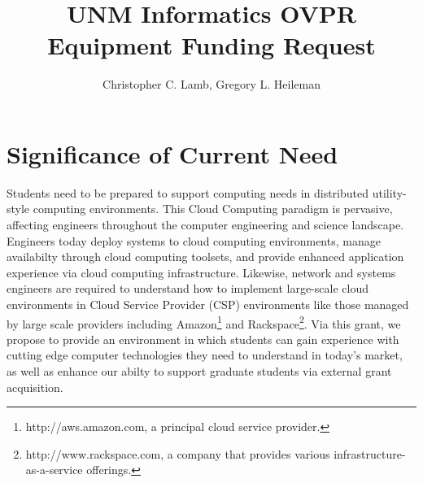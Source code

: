 \documentclass[12pt,letterpaper]{article}
\author{Christopher C. Lamb, Gregory L. Heileman}
\title{UNM Informatics OVPR Equipment Funding Request}
\date{}
\begin{document}
\maketitle


\section{Significance of Current Need}
Students need to be prepared to support computing needs in distributed utility-style computing environments. This Cloud Computing paradigm is pervasive, affecting engineers throughout the computer engineering and science landscape. Engineers today deploy systems to cloud computing environments, manage availabilty through cloud computing toolsets, and provide enhanced application experience via cloud computing infrastructure. Likewise, network and systems engineers are required to understand how to implement large-scale cloud environments in Cloud Service Provider (CSP) environments like those managed by large scale providers including Amazon\footnote{http://aws.amazon.com, a principal cloud service provider.} and Rackspace\footnote{http://www.rackspace.com, a company that provides various infrastructure-as-a-service offerings.}. Via this grant, we propose to provide an environment in which students can gain experience with cutting edge computer technologies they need to understand in today's market, as well as enhance our abilty to support graduate students via external grant acquisition.
\end{document}
